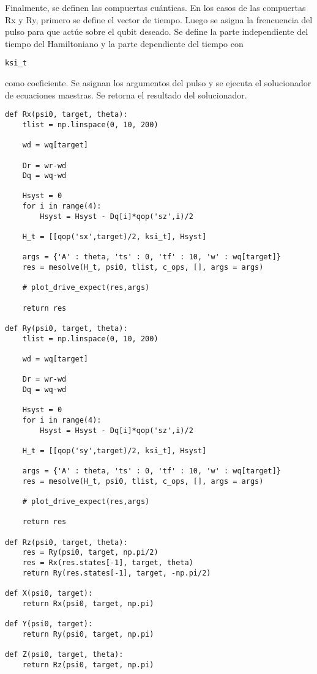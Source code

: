 Finalmente, se definen las compuertas cuánticas. En los casos de las compuertas Rx y Ry, primero se define el vector de tiempo. Luego se asigna la frencuencia del pulso para que actúe sobre el qubit deseado. Se define la parte independiente del tiempo del Hamiltoniano y la parte dependiente del tiempo con \begin{verbatim}ksi_t\end{verbatim} como coeficiente. Se asignan los argumentos del pulso y se ejecuta el solucionador de ecuaciones maestras. Se retorna el resultado del solucionador.

\begin{verbatim}
def Rx(psi0, target, theta):
    tlist = np.linspace(0, 10, 200)

    wd = wq[target]

    Dr = wr-wd
    Dq = wq-wd

    Hsyst = 0
    for i in range(4):
        Hsyst = Hsyst - Dq[i]*qop('sz',i)/2

    H_t = [[qop('sx',target)/2, ksi_t], Hsyst]

    args = {'A' : theta, 'ts' : 0, 'tf' : 10, 'w' : wq[target]}
    res = mesolve(H_t, psi0, tlist, c_ops, [], args = args)

    # plot_drive_expect(res,args)

    return res

def Ry(psi0, target, theta):
    tlist = np.linspace(0, 10, 200)

    wd = wq[target]

    Dr = wr-wd
    Dq = wq-wd

    Hsyst = 0
    for i in range(4):
        Hsyst = Hsyst - Dq[i]*qop('sz',i)/2

    H_t = [[qop('sy',target)/2, ksi_t], Hsyst]

    args = {'A' : theta, 'ts' : 0, 'tf' : 10, 'w' : wq[target]}
    res = mesolve(H_t, psi0, tlist, c_ops, [], args = args)

    # plot_drive_expect(res,args)

    return res

def Rz(psi0, target, theta):
    res = Ry(psi0, target, np.pi/2)
    res = Rx(res.states[-1], target, theta)
    return Ry(res.states[-1], target, -np.pi/2)

def X(psi0, target):
    return Rx(psi0, target, np.pi)

def Y(psi0, target):
    return Ry(psi0, target, np.pi)

def Z(psi0, target, theta):
    return Rz(psi0, target, np.pi)


\end{verbatim}
